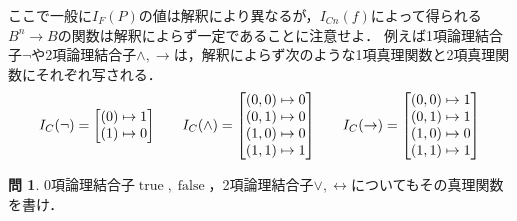 \documentclass[uplatex,a4paper,dvipdfmx]{jsarticle}
\DeclareMathOperator{\true}{\mathrm{true}}
\DeclareMathOperator{\false}{\mathrm{false}}
\theoremstyle{definition}
\newtheorem{question}{問}
\begin{document}
            ここで一般に$I_F(P)$の値は解釈により異なるが，$I_{Cn}(f)$によって得られる$B^n \to B$の関数は解釈によらず一定であることに注意せよ．
            例えば1項論理結合子$\lnot$や2項論理結合子$\land, \to$は，解釈によらず次のような1項真理関数と2項真理関数にそれぞれ写される．
            \begin{gather*}
                I_{C}(\lnot) = \mqty[(0) \mapsto 1 \\
                                      (1) \mapsto 0] \quad \quad 
                I_{C}(\land) = \mqty[(0, 0) \mapsto 0 \\
                                    (0, 1) \mapsto 0 \\
                                    (1, 0) \mapsto 0 \\
                                    (1, 1) \mapsto 1] \quad \quad
                I_{C}(\to) = \mqty[(0, 0) \mapsto 1 \\
                                    (0, 1) \mapsto 1 \\
                                    (1, 0) \mapsto 0 \\
                                    (1, 1) \mapsto 1]
            \end{gather*}

            \begin{question}
                0項論理結合子$\true, \false$，2項論理結合子$\lor, \leftrightarrow$についてもその真理関数を書け．
            \end{question}
\end{document}
